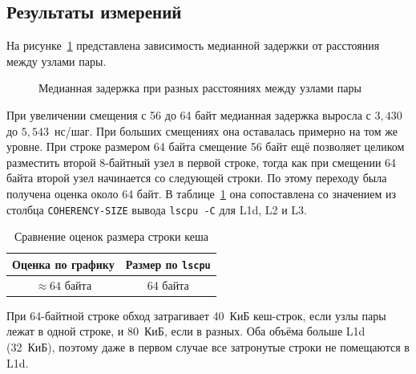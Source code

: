 \subsection{Результаты измерений}

На рисунке~\ref{fig:cache-line} представлена зависимость медианной задержки от расстояния между узлами пары.

\begin{figure}[htbp]
    \centering
    \caption{Медианная задержка при разных расстояниях между узлами пары}
    \label{fig:cache-line}
\end{figure}

При увеличении смещения с 56 до 64 байт медианная задержка выросла с $3{,}430$ до $5{,}543$~нс/шаг. При больших смещениях она оставалась примерно на том же уровне. При строке размером 64 байта смещение 56 байт ещё позволяет целиком разместить второй 8-байтный узел в первой строке, тогда как при смещении 64 байта второй узел начинается со следующей строки. По этому переходу была получена оценка около 64 байт. В таблице~\ref{tab:cache-line} она сопоставлена со значением из столбца \texttt{COHERENCY-SIZE} вывода \texttt{lscpu -C} для L1d, L2 и L3.

\begin{table}[H]
    \centering
    \caption{Сравнение оценок размера строки кеша}
    \label{tab:cache-line}
    \begin{tabular}{|c|c|}
        \hline
        Оценка по графику & Размер по \texttt{lscpu} \\
        \hline
        $\approx 64$ байта & 64 байта \\
        \hline
    \end{tabular}
\end{table}

При 64-байтной строке обход затрагивает 40~КиБ кеш-строк, если узлы пары лежат в одной строке, и 80~КиБ, если в разных. Оба объёма больше L1d (32~КиБ), поэтому даже в первом случае все затронутые строки не помещаются в L1d.
